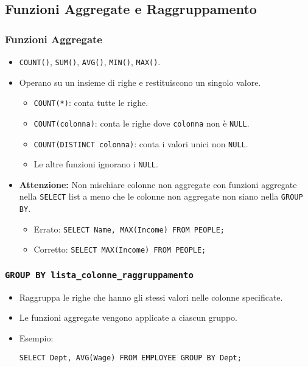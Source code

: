 	\subsection{Funzioni Aggregate e Raggruppamento}
	
	\subsubsection{Funzioni Aggregate}
	\begin{itemize}
		\item \texttt{COUNT()}, \texttt{SUM()}, \texttt{AVG()}, \texttt{MIN()}, \texttt{MAX()}.
		\item Operano su un insieme di righe e restituiscono un singolo valore.
		\begin{itemize}
			\item \texttt{COUNT(*)}: conta tutte le righe.
			\item \texttt{COUNT(colonna)}: conta le righe dove \texttt{colonna} non è \texttt{NULL}.
			\item \texttt{COUNT(DISTINCT colonna)}: conta i valori unici non \texttt{NULL}.
			\item Le altre funzioni ignorano i \texttt{NULL}.
		\end{itemize}
		\item \textbf{Attenzione:} Non mischiare colonne non aggregate con funzioni aggregate nella \texttt{SELECT} list a meno che le colonne non aggregate non siano nella \texttt{GROUP BY}.
		\begin{itemize}
			\item Errato: \texttt{SELECT Name, MAX(Income) FROM PEOPLE;}
			\item Corretto: \texttt{SELECT MAX(Income) FROM PEOPLE;}
		\end{itemize}
	\end{itemize}
	
	\subsubsection{\texttt{GROUP BY lista\_colonne\_raggruppamento}}
	\begin{itemize}
		\item Raggruppa le righe che hanno gli stessi valori nelle colonne specificate.
		\item Le funzioni aggregate vengono applicate a ciascun gruppo.
		\item Esempio:
		\begin{verbatim}
SELECT Dept, AVG(Wage) FROM EMPLOYEE GROUP BY Dept;
		\end{verbatim}
	\end{itemize}
	
